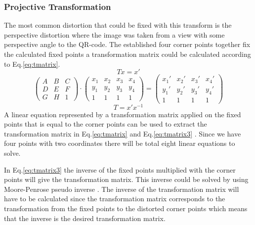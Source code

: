 \documentclass[12pt,a4paper]{article}
\begin{document}
\subsubsection{Projective Transformation}
The most common distortion that could be fixed with this transform is the perspective distortion where the image was taken from a view with some perspective angle to the QR-code. The established four corner points together fix the calculated fixed points a transformation matrix could be calculated according to Eq.\ref{eq:tmatrix}.
\begin{equation}\label{eq:tmatrix}
	Tx=x{}'
\end{equation}
\begin{equation}\label{eq:tmatrix2}
	\begin{pmatrix}
		A & B & C\\ D & E & F \\ G & H  & 1 
	\end{pmatrix}\cdot 
	\begin{pmatrix}
		x_1 & x_2  & x_3  & x_4 \\ 
		y_1 & y_2 & y_3 & y_4 \\ 
		1 & 1 & 1 & 1 
	\end{pmatrix} =
	\begin{pmatrix}
		{x_1}' & {x_2}'  & {x_3}'  & {x_4}' \\ 
		{y_1}' & {y_2}' & {y_3}' & {y_4}' \\ 
		1 & 1 & 1 & 1 
	\end{pmatrix}
\end{equation}
\begin{equation}\label{eq:tmatrix3}
	T=x'x^{-1}
\end{equation}
A linear equation represented by a transformation matrix applied on the fixed points that is equal to the corner points can be used to extract the transformation matrix in Eq.\ref{eq:tmatrix} and Eq.\ref{eq:tmatrix3} \cite{projective}.
Since we have four points with two coordinates there will be total eight linear equations to solve.

In Eq.\ref{eq:tmatrix3} the inverse of the fixed points multiplied with the corner points will give the transformation matrix. This inverse could be solved by using Moore-Penrose pseudo inverse \cite{penrose}. The inverse of the transformation matrix will have to be calculated since the transformation matrix corresponds to the transformation from the fixed points to the distorted corner points which means that the inverse is the desired transformation matrix.
\end{document}
